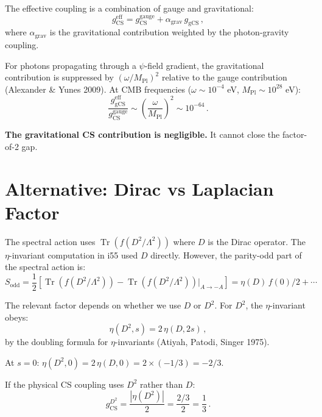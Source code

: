 \documentclass[11pt,a4paper]{article}
\newcommand{\Tr}{\operatorname{Tr}}
\begin{document}
The effective coupling is a combination of gauge and gravitational:
\begin{equation}
g_{\mathrm{CS}}^{\mathrm{eff}} = g_{\mathrm{CS}}^{\mathrm{gauge}} + \alpha_{\mathrm{grav}}\,g_{\mathrm{gCS}}\,,
\end{equation}
where $\alpha_{\mathrm{grav}}$ is the gravitational contribution weighted by the photon-gravity coupling.

For photons propagating through a $\psi$-field gradient, the gravitational contribution is suppressed by $(\omega/M_{\mathrm{Pl}})^2$ relative to the gauge contribution (Alexander \& Yunes 2009). At CMB frequencies ($\omega \sim 10^{-4}$ eV, $M_{\mathrm{Pl}} \sim 10^{28}$ eV):
\begin{equation}
\frac{g_{\mathrm{gCS}}^{\mathrm{eff}}}{g_{\mathrm{CS}}^{\mathrm{gauge}}} \sim \left(\frac{\omega}{M_{\mathrm{Pl}}}\right)^2 \sim 10^{-64}\,.
\end{equation}

\textbf{The gravitational CS contribution is negligible.} It cannot close the factor-of-2 gap.

\section{Alternative: Dirac vs Laplacian Factor}

The spectral action uses $\Tr(f(D^2/\Lambda^2))$ where $D$ is the Dirac operator. The $\eta$-invariant computation in i55 used $D$ directly. However, the parity-odd part of the spectral action is:
\begin{equation}
S_{\mathrm{odd}} = \frac{1}{2}\left[\Tr(f(D^2/\Lambda^2)) - \Tr(f(D^2/\Lambda^2))|_{A \to -A}\right] = \eta(D)\,f(0)/2 + \cdots
\end{equation}

The relevant factor depends on whether we use $D$ or $D^2$. For $D^2$, the $\eta$-invariant obeys:
\begin{equation}
\eta(D^2, s) = 2\,\eta(D, 2s)\,,
\end{equation}
by the doubling formula for $\eta$-invariants (Atiyah, Patodi, Singer 1975).

At $s = 0$: $\eta(D^2, 0) = 2\,\eta(D, 0) = 2 \times (-1/3) = -2/3$.

If the physical CS coupling uses $D^2$ rather than $D$:
\begin{equation}
g_{\mathrm{CS}}^{D^2} = \frac{|\eta(D^2)|}{2} = \frac{2/3}{2} = \frac{1}{3}\,.
\end{equation}
\end{document}
